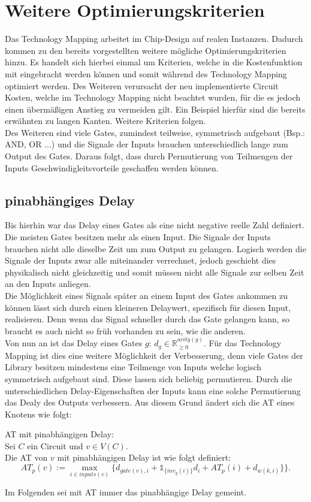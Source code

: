 \documentclass[11pt, a4paper, german]{article}
\newcommand{\TM}{Technology  Mapping }
\begin{document}
\section{Weitere Optimierungskriterien}
\label{sec:weitere_opt_krit}
Das \TM arbeitet im Chip-Design auf realen Instanzen. Dadurch kommen zu den bereits vorgestellten weitere mögliche Optimierungskriterien hinzu. Es handelt sich hierbei einmal um Kriterien, welche in die Kostenfunktion mit eingebracht werden können und somit während des \TM optimiert werden. Des Weiteren verursacht der neu implementierte Circuit Kosten, welche im \TM nicht beachtet wurden, für die es jedoch einen übermäßigen Anstieg zu vermeiden gilt. Ein Beispiel hierfür sind die bereits erwähnten zu langen Kanten. Weitere Kriterien folgen.\\
Des Weiteren sind viele Gates, zumindest teilweise, symmetrisch aufgebaut (Bsp.: AND, OR ...) und die Signale der Inputs brauchen unterschiedlich lange zum Output des Gates. Daraus folgt, dass durch Permutierung von Teilmengen der Inputs Geschwindigleitsvorteile geschaffen werden können.  
\subsection{pinabhängiges Delay}
\label{subsec:pinabh_delay}
Bis hierhin war das Delay eines Gates als eine nicht negative reelle Zahl definiert. Die meisten Gates besitzen mehr als einen Input. Die Signale der Inputs brauchen nicht alle dieselbe Zeit um zum Output zu gelangen. Logisch werden die Signale der Inputs zwar alle miteinander verrechnet, jedoch geschieht dies physikalisch nicht gleichzeitig und somit müssen nicht alle Signale zur selben Zeit an den Inputs anliegen.\\
Die Möglichkeit eines Signals später an einem Input des Gates ankommen zu können lässt sich durch einen kleineren Delaywert, spezifisch für diesen Input, realisieren. Denn wenn das Signal schneller durch das Gate gelangen kann, so braucht es auch nicht so früh vorhanden zu sein, wie die anderen. \\
Von nun an ist das Delay eines Gates $g$: $d_g \in \mathbb{R}_{\geq 0}^{arity(g)}$. Für das \TM ist dies eine weitere Möglichkeit der Verbesserung, denn viele Gates der Library besitzen mindestens eine Teilmenge von Inputs welche logisch symmetrisch aufgebaut sind. Diese lassen sich beliebig permutieren. Durch die unterschiedlichen Delay-Eigenschaften der Inputs kann eine solche Permutierung das Dealy des Outputs verbessern. Aus diesem Grund ändert sich die AT eines Knotens wie folgt: 
\begin{definition}{AT mit pinabhängigen Delay:}\\
	Sei $C$ ein Circuit und $v \in V(C)$.\\
	Die AT von $v$ mit pinabhängigen Delay ist wie folgt definiert: \[ AT_p(v) :=  \max\limits_{i \in inputs(v)} \{   d_{gate(v),i} + \mathbb{1}_{\{inv_g(i) \}} d_{i} + AT_p(i) + d_{w(k,i)} \}   \}.\]
\end{definition}
Im Folgenden sei mit AT immer das pinabhängige Delay gemeint.
\end{document}
